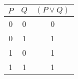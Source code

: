 \begin{tabular}{|c|c||c|}
\hline
$ P $ & $ Q $ & $ (P \vee Q) $ \\
\hline
0 & 0 & 0 \\
0 & 1 & 1 \\
1 & 0 & 1 \\
1 & 1 & 1 \\
\hline
\end{tabular}
\label{table:tt1}

